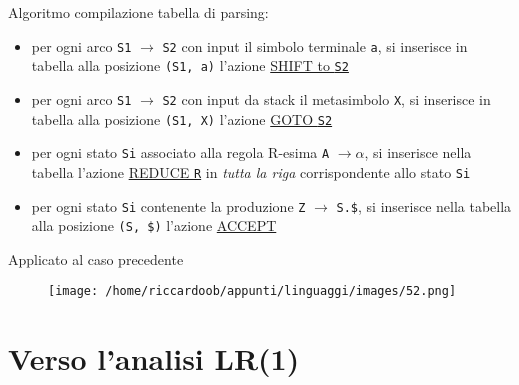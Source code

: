 Algoritmo compilazione tabella di parsing:
\begin{itemize}
    \item per ogni arco \texttt{S1} $\rightarrow$ \texttt{S2} con input il simbolo terminale \texttt{a}, si inserisce in tabella alla posizione \texttt{(S1, a)} l'azione \underline{SHIFT to \texttt{S2}}
    \item per ogni arco \texttt{S1} $\rightarrow$ \texttt{S2} con input da stack il metasimbolo \texttt{X}, si inserisce in tabella alla posizione \texttt{(S1, X)} l'azione \underline{GOTO \texttt{S2}}
    \item per ogni stato \texttt{Si} associato alla regola R-esima \texttt{A} $\rightarrow \alpha$, si inserisce nella tabella l'azione \underline{REDUCE \texttt{R}} in \textit{tutta la riga} corrispondente allo stato \texttt{Si}
    \item per ogni stato \texttt{Si} contenente la produzione \texttt{Z} $\rightarrow$ \texttt{S.\$}, si inserisce nella tabella alla posizione \texttt{(S, \$)} l'azione \underline{ACCEPT}
\end{itemize}

Applicato al caso precedente
\begin{figure}[H]
    \centering
    \texttt{[image: /home/riccardoob/appunti/linguaggi/images/52.png]}
\end{figure}

\section{Verso l'analisi LR(1)}






















































